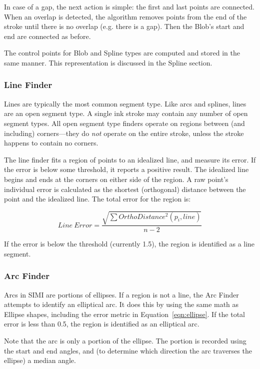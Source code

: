 In case of a gap, the next action is simple: the first and last points
are connected. When an overlap is detected, the algorithm removes
points from the end of the stroke until there is no overlap
(e.g. there is a gap). Then the Blob's start and end are connected as
before.

The control points for Blob and Spline types are computed and stored
in the same manner. This representation is discussed in the Spline
section.

\subsubsection{Line Finder}

Lines are typically the most common segment type. Like arcs and
splines, lines are an open segment type. A single ink stroke may
contain any number of open segment types. All open segment type
finders operate on regions between (and including) corners---they do
\textit{not} operate on the entire stroke, unless the stroke happens
to contain no corners.

The line finder fits a region of points to an idealized line, and
measure its error. If the error is below some threshold, it reports a
positive result. The idealized line begins and ends at the corners on
either side of the region. A raw point's individual error is
calculated as the shortest (orthogonal) distance between the point and
the idealized line. The total error for the region is:

\begin{equation}
Line\:Error = \dfrac{\sqrt{\sum OrthoDistance^2(p_i, line)}}{n-2}
\end{equation}

If the error is below the threshold (currently 1.5), the region is
identified as a line segment.

\subsubsection{Arc Finder}

Arcs in SIMI are portions of ellipses. If a region is not a line, the
Arc Finder attempts to identify an elliptical arc. It does this by
using the same math as Ellipse shapes, including the error metric in
Equation~\ref{eqn:ellipse}. If the total error is less than 0.5, the
region is identified as an elliptical arc.

Note that the arc is only a portion of the ellipse. The portion is
recorded using the start and end angles, and (to determine which
direction the arc traverses the ellipse) a median angle.

